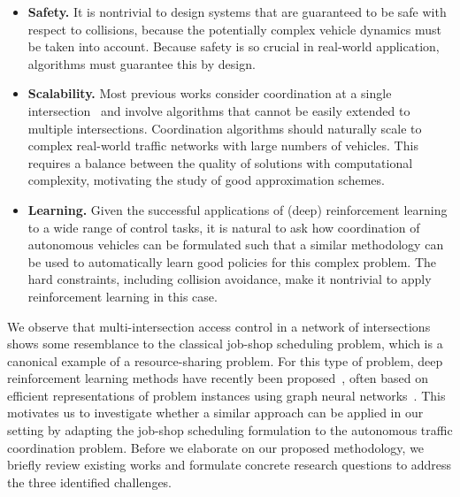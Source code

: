 \documentclass{article}
\theoremstyle{definition}
\theoremstyle{plain}
\begin{document}
\begin{itemize}

  \item \textbf{Safety.} It is nontrivial to design systems that are guaranteed
        to be safe with respect to collisions, because the potentially complex
        vehicle dynamics must be taken into account. Because safety is so
        crucial in real-world application, algorithms must guarantee this by
        design.

  \item \textbf{Scalability.} Most previous works consider coordination at a single
        intersection~\cite{khayatianSurveyIntersectionManagement2020} and involve algorithms that cannot be easily extended
        to multiple intersections. Coordination algorithms should naturally
        scale to complex real-world traffic networks with large numbers of
        vehicles. This requires a balance between the quality of solutions with
        computational complexity, motivating the study of good approximation
        schemes.

  \item \textbf{Learning.} Given the successful applications of (deep) reinforcement learning
        to a wide range of control tasks, it is natural to ask how
        coordination of autonomous vehicles can be formulated such that a
        similar methodology can be used to automatically learn good policies for
        this complex problem.
        The hard constraints, including collision avoidance, make it nontrivial to
        apply reinforcement learning in this case.
\end{itemize}

We observe that multi-intersection access control in a network of intersections
shows some resemblance to the classical job-shop scheduling problem, which is a
canonical example of a resource-sharing problem. For this type of problem, deep
reinforcement learning methods have recently been proposed~\cite{zhangLearningDispatchJob2020,zhangDeepReinforcementLearning2024}, often based on
efficient representations of problem instances using graph neural
networks~\cite{smitGraphNeuralNetworks2024}. This motivates us to investigate
whether a similar approach can be applied in our setting by adapting the
job-shop scheduling formulation to the autonomous traffic coordination problem.
Before we elaborate on our proposed methodology, we briefly review existing works
and formulate concrete research questions to address the three identified
challenges.
\end{document}

